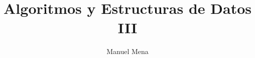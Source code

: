\documentclass[a4paper]{article}
\theoremstyle{remark}
\theoremstyle{plain}
\begin{document}
\title{Algoritmos y Estructuras de Datos III}
\author{Manuel Mena}
\maketitle

\tableofcontents

\newpage


\setcounter{section}{2}
\newpage


\setcounter{section}{4}
\newpage


\newpage


\newpage


\newpage

\end{document}
